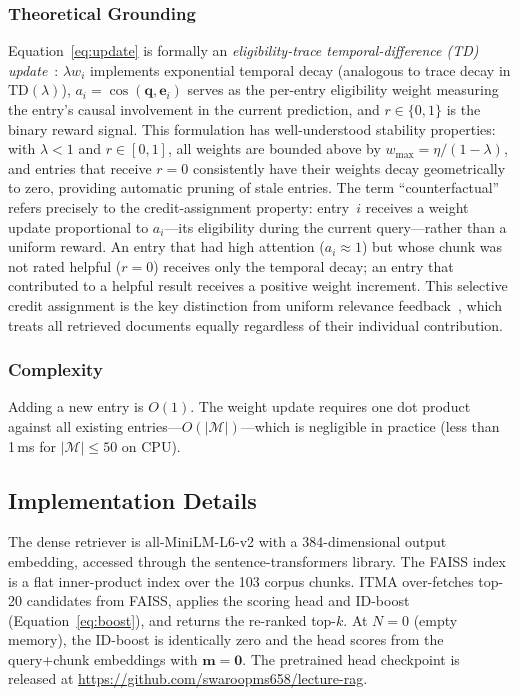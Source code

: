 \documentclass[journal]{IEEEtran}
\begin{document}
\subsubsection{Theoretical Grounding}
Equation~\eqref{eq:update} is formally an \emph{eligibility-trace
temporal-difference (TD) update}~\cite{suttonbarto2018rl}: $\lambda w_i$
implements exponential temporal decay (analogous to trace decay in
$\text{TD}(\lambda)$), $a_i = \cos(\mathbf{q},\mathbf{e}_i)$ serves as
the per-entry eligibility weight measuring the entry's causal involvement
in the current prediction, and $r\in\{0,1\}$ is the binary reward signal.
This formulation has well-understood stability properties: with
$\lambda<1$ and $r\in[0,1]$, all weights are bounded above by
$w_{\max} = \eta/(1{-}\lambda)$, and entries that receive $r=0$
consistently have their weights decay geometrically to zero, providing
automatic pruning of stale entries.  The term ``counterfactual'' refers
precisely to the credit-assignment property: entry~$i$ receives a weight
update proportional to $a_i$---its eligibility during the current
query---rather than a uniform reward.  An entry that had high attention
($a_i \approx 1$) but whose chunk was not rated helpful ($r=0$) receives
only the temporal decay; an entry that contributed to a helpful result
receives a positive weight increment.  This selective credit assignment
is the key distinction from uniform relevance
feedback~\cite{rocchio1971relevance}, which treats all retrieved
documents equally regardless of their individual contribution.

\subsubsection{Complexity}
Adding a new entry is $O(1)$.  The weight update requires one dot product
against all existing entries---$O(|\mathcal{M}|)$---which is negligible
in practice (less than 1\,ms for $|\mathcal{M}|\leq 50$ on CPU).

\subsection{Implementation Details}
The dense retriever is all-MiniLM-L6-v2 with a 384-dimensional output
embedding, accessed through the sentence-transformers library.  The FAISS
index is a flat inner-product index over the 103 corpus chunks.  ITMA
over-fetches top-20 candidates from FAISS, applies the scoring head and
ID-boost (Equation~\ref{eq:boost}), and returns the re-ranked top-$k$.
At $N{=}0$ (empty memory), the ID-boost is identically zero and the head
scores from the query+chunk embeddings with $\mathbf{m}=\mathbf{0}$.
The pretrained head checkpoint is released at
\url{https://github.com/swaroopms658/lecture-rag}.
\end{document}
